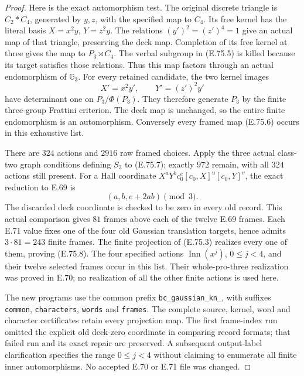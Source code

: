 \begin{proof}
Here is the exact automorphism test. The original
discrete triangle is $C_2*C_4$, generated by $y,z$,
with the specified map to $C_4$. Its free kernel
has the literal basis $X=x^2y$, $Y=z^2y$. The
relations $(y')^2=(z')^4=1$ give an actual map of
that triangle, preserving the deck map. Completion
of its free kernel at three gives the map to
$P_3\rtimes C_4$. The verbal subgroup in (E.75.5)
is killed because its target satisfies those
relations. Thus this map factors through an actual
endomorphism of $\mathbb G_3$.
For every retained candidate, the two kernel images
\[
                         X'=x^2y',\qquad Y'=(z')^2y'
 \tag{E.75.17}
\]
have determinant one on $P_3/\Phi(P_3)$. They
therefore generate $P_3$ by the finite three-group
Frattini criterion. The deck map is unchanged, so
the entire finite endomorphism is an automorphism.
Conversely every framed map (E.75.6) occurs in
this exhaustive list.

There are $324$ actions and $2916$ raw framed
choices. Apply the three actual class-two graph
conditions defining $S_3$ to (E.75.7); exactly
$972$ remain, with all $324$ actions still present.
For a Hall coordinate $X^aY^bc_0^e[c_0,X]^u[c_0,Y]^v$,
the exact reduction to E.69 is
\[
                     (a,b,e+2ab)\pmod3.
 \tag{E.75.18}
\]
The discarded deck coordinate is checked to be
zero in every old record. This actual comparison
gives $81$ frames above each of the twelve E.69
frames. Each E.71 value fixes one of the four
old Gaussian translation targets, hence admits
$3\cdot81=243$ finite frames. The finite projection
of (E.75.3) realizes every one of them, proving
(E.75.8). The four specified actions
$\operatorname{Inn}(x^j)$, $0\leq j<4$, and their
twelve selected frames occur in this list. Their
whole-pro-three realization was proved in E.70;
no realization of all the other finite actions
is used here.

The new programs use the common prefix
\texttt{bc\_gaussian\_kn\_}, with suffixes
\texttt{common}, \texttt{characters}, \texttt{words}
and \texttt{frames}. The complete source, kernel,
word and character certificates retain every
projection map. The first frame-index run omitted
the explicit old deck-zero coordinate in comparing
record formats; that failed run and its exact
repair are preserved. A subsequent output-label
clarification specifies the range $0\leq j<4$
without claiming to enumerate all finite inner
automorphisms. No accepted E.70 or E.71 file was
changed.
\end{proof}
